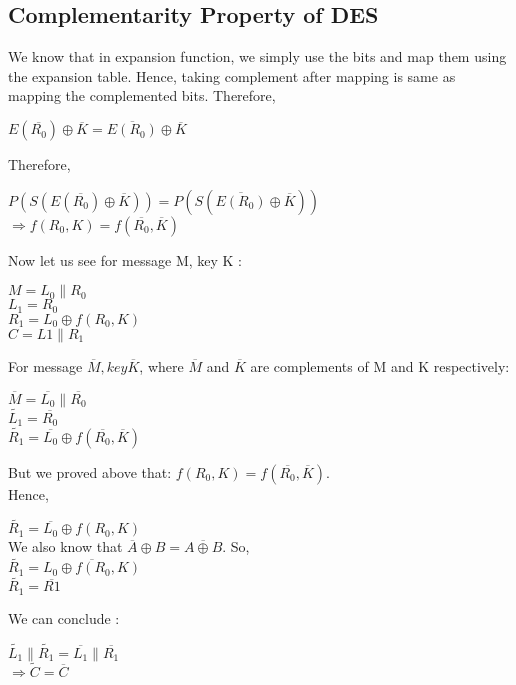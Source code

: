 \documentclass[11pt]{article}
\begin{document}
\subsection{Complementarity Property of DES}
We know that in expansion function, we simply use the bits and map them using the expansion table. Hence, taking complement after mapping is same as mapping the complemented bits. Therefore, 
\begin{center}
    $E(\overline{R_0}) \oplus \overline{K} = \overline{E(R_0)} \oplus \overline{K}$\\
\end{center}
Therefore,
\begin{center}
    $P(S(E(\overline{R_0}) \oplus \overline{K})) = P(S(\overline{E(R_0)} \oplus \overline{K}))$\\
    \vspace{5mm}
    \textbf{$\Rightarrow f(R_0, K) = f(\overline{R_0}, \overline{K})$}
\end{center}
Now let us see for message M, key K :
\begin{center}
    $M = L_0 \parallel R_0$\\
    $L_1 = R_0$\\
    $R_1 = L_0 \oplus f(R_0, K)$\\
    $C = L1 \parallel R_1$\\
\end{center}
For message $\overline{M}, key \overline{K}$, where  $\overline{M}$ and $\overline{K}$ are complements of M and K respectively:
\begin{center}
    $\overline{M} = \overline{L_0} \parallel \overline{R_0}$\\
    $ \tilde{L_1} = \overline{R_0}$\\
    $ \tilde{R_1} = \overline{L_0} \oplus f(\overline{R_0}, \overline{K})$\\
\end{center}
But we proved above that: $f(R_0, K) = f(\overline{R_0}, \overline{K})$.\\ Hence,
\begin{center}
    $\tilde{R_1} = \overline{L_0} \oplus f(R_0, K)$\\
    We also know that $\overline{A} \oplus B = \overline{A \oplus B}$. So, \\
    $\tilde{R_1} = \overline{L_0 \oplus f(R_0, K)}$\\
    $\tilde{R_1} = \overline{R1}$
\end{center}
We can conclude :
\begin{center}
    $\tilde{L_1} \parallel \tilde{R_1} = \overline{L_1} \parallel \overline{R_1}$\\
    \vspace{5mm}
    $\Rightarrow \tilde{C} = \overline{C}$
\end{center}
\end{document}
